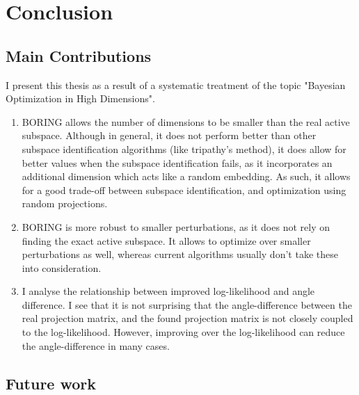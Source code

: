 \chapter{Conclusion}

\ifpdf
    \graphicspath{{Chapter7/Figs/Raster/}{Chapter7/Figs/PDF/}{Chapter7/Figs/}}
\else
    \graphicspath{{Chapter7/Figs/Vector/}{Chapter7/Figs/}}
\fi

\section{Main Contributions}
I present this thesis as a result of a systematic treatment of the topic "Bayesian Optimization in High Dimensions".

\begin{enumerate}
\item BORING allows the number of dimensions to be smaller than the real active subspace.
Although in general, it does not perform better than other subspace identification algorithms (like tripathy's method), it does allow for better values when the subspace identification fails, as it incorporates an additional dimension which acts like a random embedding.
As such, it allows for a good trade-off between subspace identification, and optimization using random projections.
\item BORING is more robust to smaller perturbations, as it does not rely on finding the exact active subspace.
It allows to optimize over smaller perturbations as well, whereas current algorithms usually don't take these into consideration.
\item I analyse the relationship between improved log-likelihood and angle difference. 
I see that it is not surprising that the angle-difference between the real projection matrix, and the found projection matrix is not closely coupled to the log-likelihood.
However, improving over the log-likelihood can reduce the angle-difference in many cases.
\end{enumerate}

\section{Future work}

